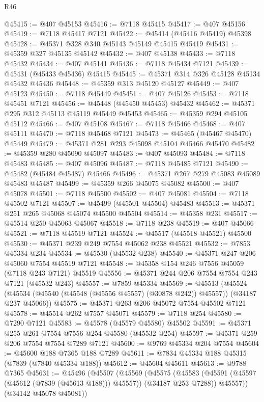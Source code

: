 \begin{lexlean}{R46}
\begin{coremodule}
@45415 := @407 @45153
@45416 := @7118 @45415
@45417 := @407 @45156
@45419 := @7118 @45417 @7121
@45422 := @45414 (@45416 @45419) @45398
@45428 := @45371 @328 @340 @45143 @45149 @45415 @45419
@45431 := @45359 @327 @45135 @45142
@45432 := @407 @45138
@45433 := @7118 @45432
@45434 := @407 @45141
@45436 := @7118 @45434 @7121
@45439 := @45431 (@45433 @45436) @45415
@45445 := @45371 @314 @326 @45128 @45134 @45432 @45436
@45448 := @45359 @313 @45120 @45127
@45449 := @407 @45123
@45450 := @7118 @45449
@45451 := @407 @45126
@45453 := @7118 @45451 @7121
@45456 := @45448 (@45450 @45453) @45432
@45462 := @45371 @295 @312 @45113 @45119 @45449 @45453
@45465 := @45359 @294 @45105 @45112
@45466 := @407 @45108
@45467 := @7118 @45466
@45468 := @407 @45111
@45470 := @7118 @45468 @7121
@45473 := @45465 (@45467 @45470) @45449
@45479 := @45371 @281 @293 @45098 @45104 @45466 @45470
@45482 := @45359 @280 @45090 @45097
@45483 := @407 @45093
@45484 := @7118 @45483
@45485 := @407 @45096
@45487 := @7118 @45485 @7121
@45490 := @45482 (@45484 @45487) @45466
@45496 := @45371 @267 @279 @45083 @45089 @45483 @45487
@45499 := @45359 @266 @45075 @45082
@45500 := @407 @45078
@45501 := @7118 @45500
@45502 := @407 @45081
@45504 := @7118 @45502 @7121
@45507 := @45499 (@45501 @45504) @45483
@45513 := @45371 @251 @265 @45068 @45074 @45500 @45504
@45514 := @45358 @231
@45517 := @45514 @250 @45063 @45067
@45518 := @7118 @238
@45519 := @407 @45066
@45521 := @7118 @45519 @7121
@45524 := @45517 (@45518 @45521) @45500
@45530 := @45371 @239 @249 @7554 @45062 @238 @45521
@45532 := @7853 @45334 @234
@45534 := @45530 (@45532 @238)
@45540 := @45371 @247 @206 @45060 @7554 @45519 @7121
@45548 := @45358 @154 @246 @7556 @45059 (@7118 @243 @7121) @45519
@45556 := @45371 @244 @206 @7554 @7554 @243 @7121 (@45532 @243)
@45557 := @7859 @45334
@45569 := @45513
    (@45524 (@45534 (@45540 (@45548 (@45556 @45557) (@30878 @242)) @45557)) (@34187 @237 @45066))
@45575 := @45371 @263 @206 @45072 @7554 @45502 @7121
@45578 := @45514 @262 @7557 @45071
@45579 := @7118 @254
@45580 := @7290 @7121
@45583 := @45578 (@45579 @45580) @45502
@45591 := @45371 @255 @261 @7554 @7556 @254 @45580 (@45532 @254)
@45597 := @45371 @259 @206 @7554 @7554 @7289 @7121
@45600 := @9769 @45334 @204 @7554
@45604 := @45600 @188 @7365 @188 @7289
@45611 := @7834 @45334 @188 @45315 (@7839 (@7840 @45334 @188))
@45612 := @45604 @45611
@45613 := @9788 @7365
@45631 := @45496
    (@45507
      (@45569
        (@45575
          (@45583 (@45591 (@45597 (@45612 (@7839 (@45613 @188))) @45557)) (@34187 @253 @7288))
          @45557))
      (@34142 @45078 @45081))

\end{coremodule}
\end{lexlean}
